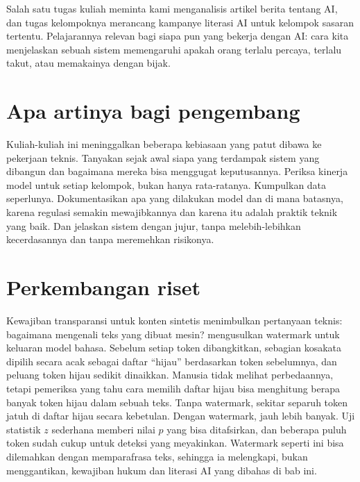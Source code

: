 Salah satu tugas kuliah meminta kami menganalisis artikel berita tentang AI, dan tugas kelompoknya
merancang kampanye literasi AI untuk kelompok sasaran tertentu. Pelajarannya relevan bagi siapa pun yang
bekerja dengan AI: cara kita menjelaskan sebuah sistem memengaruhi apakah orang terlalu percaya,
terlalu takut, atau memakainya dengan bijak.

\section{Apa artinya bagi pengembang}

Kuliah-kuliah ini meninggalkan beberapa kebiasaan yang patut dibawa ke pekerjaan teknis. Tanyakan sejak
awal siapa yang terdampak sistem yang dibangun dan bagaimana mereka bisa menggugat keputusannya. Periksa
kinerja model untuk setiap kelompok, bukan hanya rata-ratanya. Kumpulkan data seperlunya. Dokumentasikan
apa yang dilakukan model dan di mana batasnya, karena regulasi semakin mewajibkannya dan karena itu
adalah praktik teknik yang baik. Dan jelaskan sistem dengan jujur, tanpa melebih-lebihkan kecerdasannya
dan tanpa meremehkan risikonya.

\section{Perkembangan riset}

Kewajiban transparansi untuk konten sintetis menimbulkan pertanyaan teknis: bagaimana mengenali teks yang dibuat mesin?
\citet{kirchenbauer2023} mengusulkan watermark untuk keluaran model bahasa. Sebelum setiap token dibangkitkan, sebagian
kosakata dipilih secara acak sebagai daftar ``hijau'' berdasarkan token sebelumnya, dan peluang token hijau sedikit
dinaikkan. Manusia tidak melihat perbedaannya, tetapi pemeriksa yang tahu cara memilih daftar hijau bisa menghitung berapa
banyak token hijau dalam sebuah teks. Tanpa watermark, sekitar separuh token jatuh di daftar hijau secara kebetulan. Dengan
watermark, jauh lebih banyak. Uji statistik $z$ sederhana memberi nilai $p$ yang bisa ditafsirkan, dan beberapa puluh token
sudah cukup untuk deteksi yang meyakinkan. Watermark seperti ini bisa dilemahkan dengan memparafrasa teks, sehingga ia
melengkapi, bukan menggantikan, kewajiban hukum dan literasi AI yang dibahas di bab ini.

